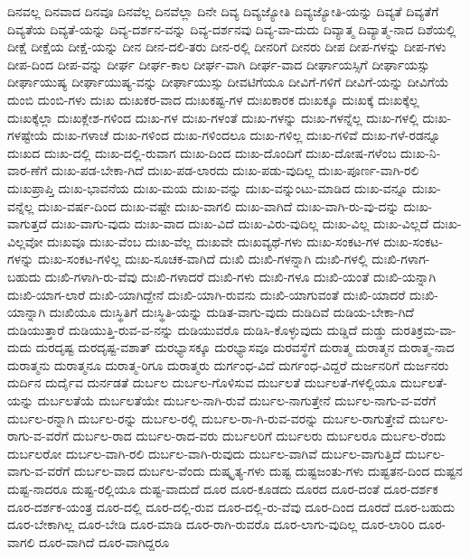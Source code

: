 {ದಿನವಲ್ಲ
ದಿನವಾದ
ದಿನವೂ
ದಿನವೆಲ್ಲ
ದಿನವೆಲ್ಲಾ
ದಿನೇ
ದಿವ್ಯ
ದಿವ್ಯಜ್ಯೋತಿ
ದಿವ್ಯಜ್ಯೋತಿ-ಯನ್ನು
ದಿವ್ಯತೆ
ದಿವ್ಯತೆಗೆ
ದಿವ್ಯತೆಯ
ದಿವ್ಯತೆ-ಯನ್ನು
ದಿವ್ಯ-ದರ್ಶನ-ವನ್ನು
ದಿವ್ಯ-ದರ್ಶನವು
ದಿವ್ಯ-ವಾ-ದುದು
ದಿವ್ಯಾತ್ಮ
ದಿವ್ಯಾತ್ಮ-ನಾದ
ದಿಶೆಯಲ್ಲಿ
ದೀಕ್ಷೆ
ದೀಕ್ಷೆಯ
ದೀಕ್ಷೆ-ಯನ್ನು
ದೀನ
ದೀನ-ದಲಿ-ತರು
ದೀನ-ರಲ್ಲಿ
ದೀನರಿಗೆ
ದೀನರು
ದೀಪ
ದೀಪ-ಗಳನ್ನು
ದೀಪ-ಗಳು
ದೀಪ-ದಿಂದ
ದೀಪ-ವನ್ನು
ದೀರ್ಘ
ದೀರ್ಘ-ಕಾಲ
ದೀರ್ಘ-ವಾಗಿ
ದೀರ್ಘ-ವಾದ
ದೀರ್ಘಾಯಸ್ಸಿಗೆ
ದೀರ್ಘಾಯಸ್ಸು
ದೀರ್ಘಾಯುಷ್ಯ
ದೀರ್ಘಾಯುಷ್ಯ-ವನ್ನು
ದೀರ್ಘಾಯುಸ್ಸು
ದೀವಟಿಗೆಯೂ
ದೀವಿಗೆ-ಗಳಿಗೆ
ದೀವಿಗೆ-ಯನ್ನು
ದೀವಿಗೆಯೆ
ದುಂಬಿ
ದುಂಬಿ-ಗಳು
ದುಃಖ
ದುಃಖಕರ-ವಾದ
ದುಃಖಕಷ್ಟ-ಗಳ
ದುಃಖಕಾರಕ
ದುಃಖಕ್ಕೂ
ದುಃಖಕ್ಕೆ
ದುಃಖಕ್ಕೆಲ್ಲ
ದುಃಖಕ್ಕೆಲ್ಲಾ
ದುಃಖಕ್ಲೇಶ-ಗಳಿಂದ
ದುಃಖ-ಗಳ
ದುಃಖ-ಗಳಂತೆ
ದುಃಖ-ಗಳನ್ನು
ದುಃಖ-ಗಳನ್ನೆಲ್ಲ
ದುಃಖ-ಗಳಲ್ಲಿ
ದುಃಖ-ಗಳಷ್ಟೇಯೆ
ದುಃಖ-ಗಳಾಚೆ
ದುಃಖ-ಗಳಿಂದ
ದುಃಖ-ಗಳಿಂದಲೂ
ದುಃಖ-ಗಳಿಲ್ಲ
ದುಃಖ-ಗಳಿವೆ
ದುಃಖ-ಗಳೆ-ರಡನ್ನೂ
ದುಃಖದ
ದುಃಖ-ದಲ್ಲಿ
ದುಃಖ-ದಲ್ಲಿ-ರುವಾಗ
ದುಃಖ-ದಿಂದ
ದುಃಖ-ದೊಂದಿಗೆ
ದುಃಖ-ದೋಷ-ಗಳೆಂಬ
ದುಃಖ-ನಿ-ವಾರ-ಣೆಗೆ
ದುಃಖ-ಪಡ-ಬೇಕಾ-ಗಿದೆ
ದುಃಖ-ಪಡ-ಲಾರದು
ದುಃಖ-ಪಡು-ವುದಿಲ್ಲ
ದುಃಖ-ಪೂರ್ಣ-ವಾಗಿ-ರಲಿ
ದುಃಖಪ್ರಾಪ್ತಿ
ದುಃಖ-ಭಾವನೆಯ
ದುಃಖ-ಮಯ
ದುಃಖ-ವನ್ನು
ದುಃಖ-ವನ್ನುಂಟು-ಮಾಡಿದ
ದುಃಖ-ವನ್ನೂ
ದುಃಖ-ವನ್ನೆಲ್ಲ
ದುಃಖ-ವರ್ಷ-ದಿಂದ
ದುಃಖ-ವಷ್ಟೇ
ದುಃಖ-ವಾಗಲಿ
ದುಃಖ-ವಾಗಿದೆ
ದುಃಖ-ವಾಗಿ-ರು-ವು-ದನ್ನು
ದುಃಖ-ವಾಗುತ್ತದೆ
ದುಃಖ-ವಾಗು-ವುದು
ದುಃಖ-ವಾದ
ದುಃಖ-ವಿದೆ
ದುಃಖ-ವಿರು-ವುದಿಲ್ಲ
ದುಃಖ-ವಿಲ್ಲ
ದುಃಖ-ವಿಲ್ಲದೆ
ದುಃಖ-ವಿಲ್ಲವೋ
ದುಃಖವೂ
ದುಃಖ-ವೆಂಬ
ದುಃಖ-ವೆಲ್ಲ
ದುಃಖವೇ
ದುಃಖವ್ಯಥೆ-ಗಳು
ದುಃಖ-ಸಂಕಟ-ಗಳ
ದುಃಖ-ಸಂಕಟ-ಗಳನ್ನು
ದುಃಖ-ಸಂಕಟ-ಗಳಿಲ್ಲ
ದುಃಖ-ಸೂಚಕ-ವಾಗಿದೆ
ದುಃಖಿ
ದುಃಖಿ-ಗಳನ್ನಾಗಿ
ದುಃಖಿ-ಗಳಲ್ಲಿ
ದುಃಖಿ-ಗಳಾಗ-ಬಹುದು
ದುಃಖಿ-ಗಳಾಗಿ-ರು-ವೆವು
ದುಃಖಿ-ಗಳಾದರೆ
ದುಃಖಿ-ಗಳು
ದುಃಖಿ-ಗಳೂ
ದುಃಖಿ-ಯಂತೆ
ದುಃಖಿ-ಯನ್ನಾಗಿ
ದುಃಖಿ-ಯಾಗ-ಲಾರೆ
ದುಃಖಿ-ಯಾಗಿದ್ದೇನೆ
ದುಃಖಿ-ಯಾಗಿ-ರುವನು
ದುಃಖಿ-ಯಾಗುವಂತೆ
ದುಃಖಿ-ಯಾದರೆ
ದುಃಖಿ-ಯಾನ್ನಾಗಿ
ದುಃಖಿಯೂ
ದುಃಸ್ಥಿತಿಗೆ
ದುಃಸ್ಥಿತಿ-ಯನ್ನು
ದುಡಿತ-ವಾಗು-ವುದು
ದುಡಿದಿವೆ
ದುಡಿಯ-ಬೇಕಾ-ಗಿದೆ
ದುಡಿಯುತ್ತಾರೆ
ದುಡಿಯುತ್ತಿ-ರುವ-ವ-ನನ್ನು
ದುಡಿಯುವರೊ
ದುಡಿಸಿ-ಕೊಳ್ಳುವುದು
ದುಡ್ಡಿದೆ
ದುಡ್ಡು
ದುರತಿಕ್ರಮ-ವಾ-ದುದು
ದುರದೃಷ್ಟ
ದುರದೃಷ್ಟ-ವಶಾತ್
ದುರಭ್ಯಾಸಕ್ಕೂ
ದುರಭ್ಯಾಸವೂ
ದುರವಸ್ಥೆಗೆ
ದುರಾತ್ಮ
ದುರಾತ್ಮನ
ದುರಾತ್ಮ-ನಾದ
ದುರಾತ್ಮನು
ದುರಾತ್ಮನೂ
ದುರಾತ್ಮ-ರಿಗೂ
ದುರಾತ್ಮರು
ದುರ್ಗಂಧ-ವಿದೆ
ದುರ್ಗಂಧ-ವಿದ್ದರೆ
ದುರ್ಜನರಿಗೆ
ದುರ್ಜನರು
ದುರ್ದಿನ
ದುರ್ದೈವ
ದುರ್ನಡತೆ
ದುರ್ಬಲ
ದುರ್ಬಲ-ಗೊಳಿಸುವ
ದುರ್ಬಲತೆ
ದುರ್ಬಲತೆ-ಗಳಲ್ಲಿಯೂ
ದುರ್ಬಲತೆ-ಯನ್ನು
ದುರ್ಬಲತೆಯೆ
ದುರ್ಬಲತೆಯೇ
ದುರ್ಬಲ-ನಾಗಿ-ರುವೆ
ದುರ್ಬಲ-ನಾಗುತ್ತೇನೆ
ದುರ್ಬಲ-ನಾಗು-ವ-ವರೆಗೆ
ದುರ್ಬಲ-ರನ್ನಾಗಿ
ದುರ್ಬಲ-ರನ್ನು
ದುರ್ಬಲ-ರಲ್ಲಿ
ದುರ್ಬಲ-ರಾ-ಗಿ-ರುವ-ವರನ್ನು
ದುರ್ಬಲ-ರಾಗುತ್ತೇವೆ
ದುರ್ಬಲ-ರಾಗು-ವ-ವರೆಗೆ
ದುರ್ಬಲ-ರಾದ
ದುರ್ಬಲ-ರಾದ-ವರು
ದುರ್ಬಲರಿಗೆ
ದುರ್ಬಲರು
ದುರ್ಬಲರೂ
ದುರ್ಬಲ-ರೆಂದು
ದುರ್ಬಲರೋ
ದುರ್ಬಲ-ವಾಗಿ-ರಲಿ
ದುರ್ಬಲ-ವಾಗಿ-ರುವುದು
ದುರ್ಬಲ-ವಾಗಿವೆ
ದುರ್ಬಲ-ವಾಗುತ್ತಿದೆ
ದುರ್ಬಲ-ವಾಗು-ವ-ವರೆಗೆ
ದುರ್ಬಲ-ವಾದ
ದುರ್ಬಲ-ವೆಂದು
ದುಷ್ಕೃತ್ಯ-ಗಳು
ದುಷ್ಟ
ದುಷ್ಟಜಂತು-ಗಳು
ದುಷ್ಟತನ-ದಿಂದ
ದುಷ್ಟನ
ದುಷ್ಟ-ನಾದರೂ
ದುಷ್ಟ-ರಲ್ಲಿಯೂ
ದುಷ್ಟ-ವಾದುದೆ
ದೂರ
ದೂರ-ಕೂಡದು
ದೂರದ
ದೂರ-ದಂತೆ
ದೂರ-ದರ್ಶಕ
ದೂರ-ದರ್ಶಕ-ಯಂತ್ರ
ದೂರ-ದಲ್ಲಿ
ದೂರ-ದಲ್ಲಿ-ರುವ
ದೂರ-ದಲ್ಲಿ-ರು-ವೆವು
ದೂರ-ದಿಂದ
ದೂರದೆ
ದೂರ-ಬಹುದು
ದೂರ-ಬೇಕಾಗಿಲ್ಲ
ದೂರ-ಬೇಡಿ
ದೂರ-ಮಾಡಿ
ದೂರ-ರಾಗಿ-ರುವರೊ
ದೂರ-ಲಾಗು-ವುದಿಲ್ಲ
ದೂರ-ಲಾರಿರಿ
ದೂರ-ವಾಗಲಿ
ದೂರ-ವಾಗಿದೆ
ದೂರ-ವಾಗಿದ್ದರೂ
}
